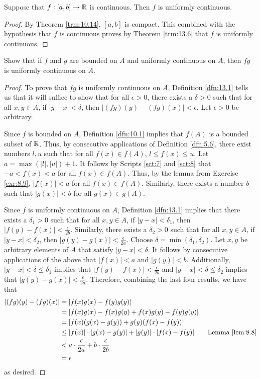 \documentclass[../main.tex]{subfiles}
\begin{document}
\begin{corollary}\label{cly:13.8}
    Suppose that $f:[a,b]\to\mathbb{R}$ is continuous. Then $f$ is uniformly continuous.
    \begin{proof}
        By Theorem \ref{trm:10.14}, $[a,b]$ is compact. This combined with the hypothesis that $f$ is continuous proves by Theorem \ref{trm:13.6} that $f$ is uniformly continuous.
    \end{proof}
\end{corollary}

\begin{exercise}\label{exr:13.9}
    Show that if $f$ and $g$ are bounded on $A$ and uniformly continuous on $A$, then $fg$ is uniformly continuous on $A$.
    \begin{proof}
        To prove that $fg$ is uniformly continuous on $A$, Definition \ref{dfn:13.1} tells us that it will suffice to show that for all $\epsilon>0$, there exists a $\delta>0$ such that for all $x,y\in A$, if $|y-x|<\delta$, then $|(fg)(y)-(fg)(x)|<\epsilon$. Let $\epsilon>0$ be arbitrary.\par
        Since $f$ is bounded on $A$, Definition \ref{dfn:10.1} implies that $f(A)$ is a bounded subset of $\mathbb{R}$. Thus, by consecutive applications of Definition \ref{dfn:5.6}, there exist numbers $l,u$ such that for all $f(x)\in f(A)$, $l\leq f(x)\leq u$. Let $a=\max(|l|,|u|)+1$. It follows by Scripts \ref{sct:7} and \ref{sct:8} that $-a<f(x)<a$ for all $f(x)\in f(A)$. Thus, by the lemma from Exercise \ref{exr:8.9}, $|f(x)|<a$ for all $f(x)\in f(A)$. Similarly, there exists a number $b$ such that $|g(x)|<b$ for all $g(x)\in g(A)$.\par
        Since $f$ is uniformly continuous on $A$, Definition \ref{dfn:13.1} implies that there exists a $\delta_1>0$ such that for all $x,y\in A$, if $|y-x|<\delta_1$, then $|f(y)-f(x)|<\frac{\epsilon}{2b}$. Similarly, there exists a $\delta_2>0$ such that for all $x,y\in A$, if $|y-x|<\delta_2$, then $|g(y)-g(x)|<\frac{\epsilon}{2a}$. Choose $\delta=\min(\delta_1,\delta_2)$. Let $x,y$ be arbitrary elements of $A$ that satisfy $|y-x|<\delta$. It follows by consecutive applications of the above that $|f(x)|<a$ and $|g(y)|<b$. Additionally, $|y-x|<\delta\leq\delta_1$ implies that $|f(y)-f(x)|<\frac{\epsilon}{2b}$ and $|y-x|<\delta\leq\delta_2$ implies that $|g(y)-g(x)|<\frac{\epsilon}{2a}$. Therefore, combining the last four results, we have that
        \begin{align*}
            |(fg)(y)-(fg)(x)| &= |f(x)g(x)-f(y)g(y)|\\
            &= |f(x)g(x)-f(x)g(y)+f(x)g(y)-f(y)g(y)|\\
            &= |f(x)(g(x)-g(y))+g(y)(f(x)-f(y))|\\
            &\leq |f(x)|\cdot|g(x)-g(y)|+|g(y)|\cdot|f(x)-f(y)|\tag*{Lemma \ref{lem:8.8}}\\
            &< a\cdot\frac{\epsilon}{2a}+b\cdot\frac{\epsilon}{2b}\\
            &= \epsilon
        \end{align*}
        as desired.
    \end{proof}
\end{exercise}
\end{document}
